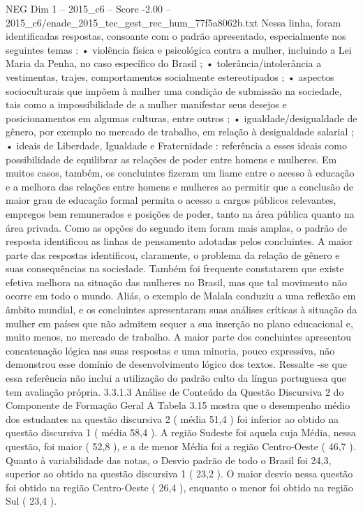 \begin{textsample}{NEG Dim 1 – 2015\_c6 – Score -2.00 – 2015\_c6/enade\_2015\_tec\_gest\_rec\_hum\_77f5a8062b.txt}
Nessa linha, foram identificadas respostas, consoante com o padrão apresentado, especialmente nos seguintes temas : • violência física e psicológica contra a mulher, incluindo a Lei Maria da Penha, no caso específico do Brasil ; • tolerância/intolerância a vestimentas, trajes, comportamentos socialmente estereotipados ; • aspectos socioculturais que impõem à mulher uma condição de submissão na sociedade, tais como a impossibilidade de a mulher manifestar seus desejos e posicionamentos em algumas culturas, entre outros ; • igualdade/desigualdade de gênero, por exemplo no mercado de trabalho, em relação à desigualdade salarial ; • ideais de Liberdade, Igualdade e Fraternidade : referência a esses ideais como possibilidade de equilibrar as relações de poder entre homens e mulheres.
Em muitos casos, também, os concluintes fizeram um liame entre o acesso à educação e a melhora das relações entre homens e mulheres ao permitir que a conclusão de maior grau de educação formal permita o acesso a cargos públicos relevantes, empregos bem remunerados e posições de poder, tanto na área pública quanto na área privada.
Como as opções do segundo item foram mais amplas, o padrão de resposta identificou as linhas de pensamento adotadas pelos concluintes.
A maior parte das respostas identificou, claramente, o problema da relação de gênero e suas consequências na sociedade.
Também foi frequente constatarem que existe efetiva melhora na situação das mulheres no Brasil, mas que tal movimento não ocorre em todo o mundo.
Aliás, o exemplo de Malala conduziu a uma reflexão em âmbito mundial, e os concluintes apresentaram suas análises críticas à situação da mulher em países que não admitem sequer a sua inserção no plano educacional e, muito menos, no mercado de trabalho.
A maior parte dos concluintes apresentou concatenação lógica nas suas respostas e uma minoria, pouco expressiva, não demonstrou esse domínio de desenvolvimento lógico dos textos.
Ressalte -se que essa referência não inclui a utilização do padrão culto da língua portuguesa que tem avaliação própria. 3.3.1.3 Análise de Conteúdo da Questão Discursiva 2 do Componente de Formação Geral A Tabela 3.15 mostra que o desempenho médio dos estudantes na questão discursiva 2 ( média 51,4 ) foi inferior ao obtido na questão discursiva 1 ( média 58,4 ).
A região Sudeste foi aquela cuja Média, nessa questão, foi maior ( 52,8 ), e a de menor Média foi a região Centro-Oeste ( 46,7 ).
Quanto à variabilidade das notas, o Desvio padrão de todo o Brasil foi 24,3, superior ao obtido na questão discursiva 1 ( 23,2 ).
O maior desvio nessa questão foi obtido na região Centro-Oeste ( 26,4 ), enquanto o menor foi obtido na região Sul ( 23,4 ).

\end{textsample}
